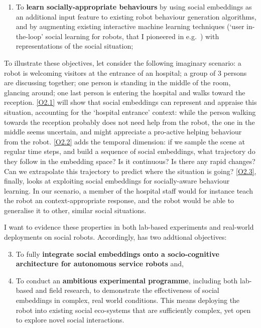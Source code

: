 \begin{rewrite}
\begin{enumerate}[label=\textbf{(\arabic*)}]
\begin{enumerate}[label=\textbf{O2.\arabic*}]
    \item \label{O2.3} To \textbf{learn socially-appropriate behaviours} by using
        social embeddings as an additional input feature to existing robot behaviour
        generation algorithms, and by augmenting existing interactive machine
        learning techniques (`user in-the-loop' social learning for robots, that I
        pioneered in e.g.~\cite{winkle2021leador}) with
        representations of the social situation;

\end{enumerate}
\end{enumerate}

\noindent To illustrate these objectives, let consider the following imaginary
scenario: a robot is welcoming visitors at the entrance of an hospital; a group
of 3 persons are discussing together; one person is standing in the middle of
the room, glancing around; one last person is entering the hospital and
walks toward the reception. \ref{O2.1} will show that social embeddings can
represent and appraise this situation, accounting for the `hospital entrance' context: while
the person walking towards the reception probably does not need help from the
robot, the one in the middle seems uncertain, and might appreciate a pro-active
helping behaviour from the robot. \ref{O2.2} adds the temporal dimension: if we
sample the scene at regular time steps, and build a sequence of social
embeddings, what trajectory do they follow in the embedding space? Is it
continuous? Is there any rapid changes? Can we extrapolate this trajectory to
predict where the situation is going? \ref{O2.3}, finally, looks at exploiting
social embeddings for socially-aware behaviour learning. In our scenario, a
member of the hospital staff would for instance teach the robot an
context-appropriate response, and the robot would be able to generalise it to
other, similar social situations.


I want to evidence these properties in both lab-based experiments and
real-world deployments on social robots. Accordingly, \project has two addtional
objectives:

\begin{enumerate}[label=\textbf{O\arabic*}]
    \setcounter{enumi}{2}
    \item \label{O3} To fully {\bf integrate social embeddings onto a
        socio-cognitive architecture for autonomous service robots} and,

    \item \label{O4} To conduct an {\bf ambitious experimental programme},
        including both lab-based and field research, to demonstrate the
        effectiveness of social embeddings in complex, real world conditions.
        This means deploying the \project robot into existing social eco-systems
        that are sufficiently complex, yet open to explore novel social interactions.
\end{enumerate}


\end{rewrite}

